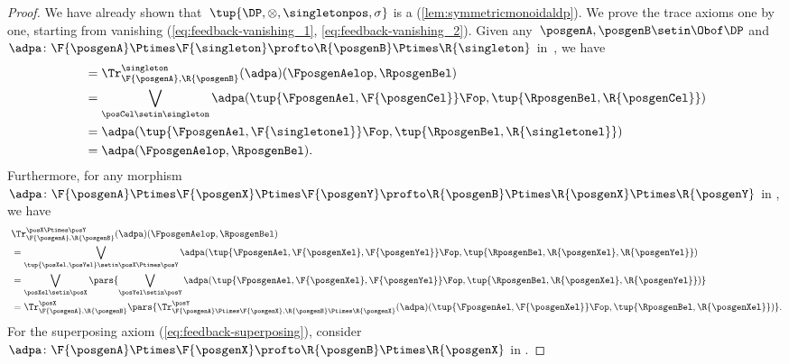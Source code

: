 \begin{proof}
    We have already shown that~$\tup{\DP,{{\otimes}},\singletonpos,\sigma}$ is a  (\cref{lem:symmetricmonoidaldp}).
    We prove the trace axioms one by one, starting from vanishing (\cref{eq:feedback-vanishing_1}, \cref{eq:feedback-vanishing_2}).
    Given any~$\posgenA,\posgenB\setin \Obof\DP$ and~$\adpa\colon \F{\posgenA}\Ptimes \F{\singleton}\profto \R{\posgenB}\Ptimes \R{\singleton}$ in~\DP, we have
    \begin{equation}
        \begin{aligned}
             & = \Tr_{\F{\posgenA},\R{\posgenB}}^{\singleton}(\adpa)(\FposgenAelop,\RposgenBel) \\
             & =\bigvee_{\posCel\setin \singleton}\adpa(\tup{\FposgenAel,\F{\posgenCel}}\Fop, \tup{\RposgenBel,\R{\posgenCel}}) \\
             & =\adpa(\tup{\FposgenAel,\F{\singletonel}}\Fop, \tup{\RposgenBel,\R{\singletonel}}) \\
             & =\adpa(\FposgenAelop,\RposgenBel).
        \end{aligned}
    \end{equation}
    Furthermore, for any morphism~$\adpa\colon \F{\posgenA}\Ptimes \F{\posgenX}\Ptimes \F{\posgenY} \profto \R{\posgenB}\Ptimes \R{\posgenX} \Ptimes \R{\posgenY}$ in \DP, we have
    \begin{equation}
        \begin{aligned}
            ~ & \Tr_{\F{\posgenA},\R{\posgenB}}^{\posX\Ptimes\posY}(\adpa)(\FposgenAelop,\RposgenBel) \\
              & = \bigvee_{\tup{\posXel,\posYel} \setin \posX\Ptimes \posY} \adpa(\tup{\FposgenAel,\F{\posgenXel},\F{\posgenYel}}\Fop, \tup{\RposgenBel,\R{\posgenXel},\R{\posgenYel}}) \\
              & =\bigvee_{\posXel \setin \posX}\pars{\bigvee_{\posYel \setin \posY} \adpa(\tup{\FposgenAel,\F{\posgenXel},\F{\posgenYel}}\Fop, \tup{\RposgenBel,\R{\posgenXel},\R{\posgenYel}})} \\
              & =\Tr_{\F{\posgenA},\R{\posgenB}}^\posX\pars{
                \Tr_{\F{\posgenA}\Ptimes \F{\posgenX},\R{\posgenB}\Ptimes \R{\posgenX}}^\posY(\adpa)(\tup{\FposgenAel,\F{\posgenXel}}\Fop, \tup{\RposgenBel,\R{\posgenXel}})}.
        \end{aligned}
    \end{equation}
    For the superposing axiom (\cref{eq:feedback-superposing}), consider~$\adpa\colon \F{\posgenA}\Ptimes \F{\posgenX}\profto \R{\posgenB}\Ptimes \R{\posgenX}$ in \DP.

\end{proof}
